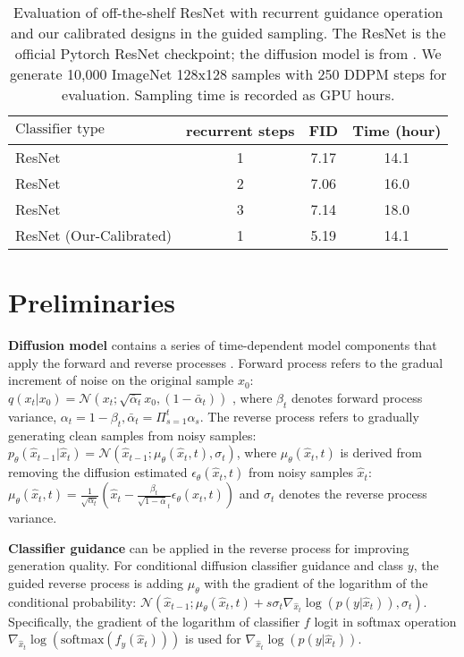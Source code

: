 \documentclass{article}
\theoremstyle{definition}
\begin{document}
\begin{table}[h!]
\caption{Evaluation of off-the-shelf ResNet with recurrent guidance operation and our calibrated designs in the guided sampling. The ResNet is the official Pytorch ResNet checkpoint; the diffusion model is from \cite{dhariwal2021diffusion}. We generate 10,000 ImageNet 128x128 samples with 250 DDPM steps for evaluation. Sampling time is recorded as GPU hours.}
\label{table:recurrent_guidance_result}
\begin{center}
\begin{small}
\begin{tabular}{lccc}
\toprule
$\text{Classifier type}$  & recurrent steps & FID & Time (hour)\\
\midrule
ResNet   & 1 &  7.17 & 14.1  \\  
ResNet    & 2 &  7.06 & 16.0  \\  
ResNet   & 3 &  7.14 & 18.0 \\   
ResNet (Our-Calibrated)  & 1 &  5.19 & 14.1 \\ 
\bottomrule
\end{tabular}
\end{small}
\end{center}
\end{table}


\section{Preliminaries}
\textbf{Diffusion model} contains a series of time-dependent model components that apply the forward and reverse processes \citep{sohl2015deep, ho2020denoising}. Forward process refers to the gradual increment of noise on the original sample $x_0$: 
$q(x_t|x_0) = \mathcal{N}(x_t; \sqrt{\bar{\alpha}_t}x_0, (1-\bar{\alpha}_t)) $
, where $\beta_t$ denotes forward process variance, $\alpha_t=1-\beta_t, \bar{\alpha}_t=\Pi_{s=1}^{t} \alpha_s$. 
The reverse process refers to gradually generating clean samples from noisy samples: $p_{\theta}(\hat{x}_{t-1}|\hat{x}_t)=\mathcal{N}(\hat{x}_{t-1}; \mu_{\theta}(\hat{x}_{t},t), \sigma_t)$, where $\mu_{\theta}(\hat{x}_{t},t)$ is derived from removing the diffusion estimated $\epsilon_{\theta}(\hat{x}_{t},t)$ from noisy samples $\hat{x}_{t}$: $\mu_{\theta}(\hat{x}_{t},t) = \frac{1}{\sqrt{\alpha_t}}( \hat{x}_{t} - \frac{\beta_t}{\sqrt{1-\bar{\alpha}}_t}\epsilon_{\theta}(\hat{x}_{t},t) )$ and   
$\sigma_t$ denotes the reverse process variance. 

\textbf{Classifier guidance} \citep{dhariwal2021diffusion} can be applied in the reverse process for improving generation quality. For conditional diffusion classifier guidance and class $y$, the guided reverse process is adding $\mu_{\theta}$ with the gradient of the logarithm of the conditional probability: $ \mathcal{N}(\hat{x}_{t-1}; \mu_{\theta}(\hat{x}_{t},t) + s \sigma_t \nabla_{\hat{x}_t}\log(p(y|\hat{x}_t)), \sigma_t) $. 
Specifically, the gradient of the logarithm of classifier $f$ logit in softmax operation $\nabla_{\hat{x}_t}\log(\text{softmax}(f_y(\hat{x}_t)))$ is used for $\nabla_{\hat{x}_t}\log(p(y|\hat{x}_t))$. 
\end{document}
